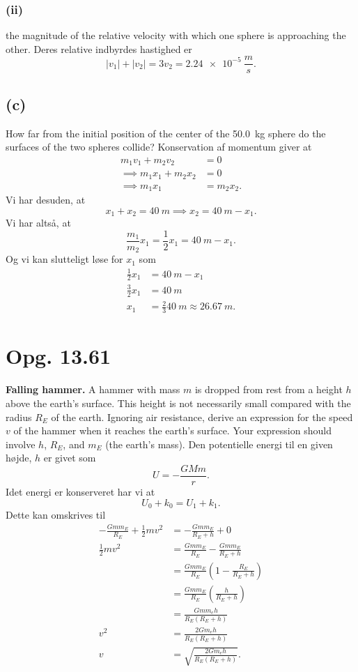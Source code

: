 \documentclass[12pt]{article}
\theoremstyle{definition}
\begin{document}
\subsubsection*{(ii)}
the magnitude of the relative velocity with which one sphere is approaching the other.
\bigbreak
Deres relative indbyrdes hastighed er
\[ 
|v_1| + |v_2| = 3 v_2 = \qty{2,24e-5}{\frac{m}{s}} 
.\]


\subsection*{(c)}
How far from the initial position of the center of the \qty{50,0}{kg}  sphere do the surfaces of the two spheres collide?
\bigbreak
Konservation af momentum giver at
\begin{align*}
  m_1 v_1 + m_2v_2 &= 0 \\
  \implies m_1 x_1 + m_2 x_2 &= 0 \\
  \implies m_1 x_1 &= m_2 x_2
.\end{align*}
Vi har desuden, at
\[ 
x_1 + x_2 = \qty{40}{m} \implies x_2 = \qty{40}{m} - x_1
.\]
Vi har altså, at
\[ 
\frac{m_1}{m_2} x_1 = \frac{1}{2}x_1 = \qty{40}{m} - x_1
.\]
Og vi kan slutteligt løse for $x_1$ som
\begin{align*}
  \frac{1}{2}x_1 &= \qty{40}{m} - x_1 \\
  \frac{3}{2} x_1 &= \qty{40}{m} \\
  x_1 &= \frac{2}{3} \qty{40}{m} \approx \qty{26,67}{m} 
.\end{align*}


\section*{Opg. 13.61}
\textbf{Falling hammer.} A hammer with mass $m$ is dropped from rest from a height $h$ above the earth’s surface. This height is not necessarily small compared with the radius $R_E$ of the earth. Ignoring air resistance, derive an expression for the speed $v$ of the hammer when it reaches the earth’s surface. Your expression should involve $h$, $R_E$, and $m_E$ (the earth’s mass).
\bigbreak
Den potentielle energi til en given højde, $h$ er givet som
\[ 
U = -\frac{GMm}{r}
.\]
Idet energi er konserveret har vi at
\[ 
U_0 + k_0 = U_1 + k_1
.\]
Dette kan omskrives til
\begin{align*}
  - \frac{Gmm_E}{R_E} + \frac{1}{2} m v^2 &= -\frac{Gmm_E}{R_E + h} + 0 \\
  \frac{1}{2}mv^2 &= \frac{Gmm_E}{R_E} - \frac{Gmm_E}{R_E + h} \\
       &= \frac{Gmm_E}{R_E} \left( 1 - \frac{R_E}{R_E + h} \right)  \\
       &= \frac{Gmm_E}{R_E} \left( \frac{h}{R_E + h} \right)  \\
       &= \frac{Gmm_eh}{R_E(R_E + h)}  \\
    v^2 &= \frac{2Gm_eh}{R_E(R_E + h)} \\
    v  &=  \sqrt{\frac{2Gm_eh}{R_E(R_E + h)}}
.\end{align*}
\end{document}
